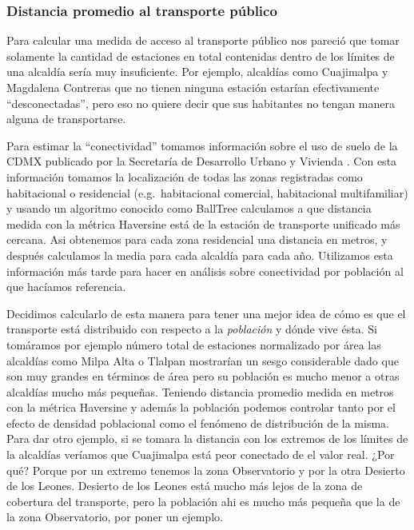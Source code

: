 \documentclass[
  spanish,
]{article}
\begin{document}
\hypertarget{distancia-promedio-al-transporte-puxfablico}{%
\subsubsection{Distancia promedio al transporte
público}\label{distancia-promedio-al-transporte-puxfablico}}

Para calcular una medida de acceso al transporte público nos pareció que
tomar solamente la cantidad de estaciones en total contenidas dentro de
los límites de una alcaldía sería muy insuficiente. Por ejemplo,
alcaldías como Cuajimalpa y Magdalena Contreras que no tienen ninguna
estación estarían efectivamente ``desconectadas'', pero eso no quiere
decir que sus habitantes no tengan manera alguna de transportarse.

Para estimar la ``conectividad'' tomamos información sobre el uso de
suelo de la CDMX publicado por la Secretaría de Desarrollo Urbano y
Vivienda \cite{usodesuelo}. Con esta información tomamos la localización
de todas las zonas registradas como habitacional o residencial
(e.g.~habitacional comercial, habitacional multifamiliar) y usando un
algoritmo conocido como BallTree calculamos a que distancia medida con
la métrica Haversine está de la estación de transporte unificado más
cercana. Asi obtenemos para cada zona residencial una distancia en
metros, y después calculamos la media para cada alcaldía para cada año.
Utilizamos esta información más tarde para hacer en análisis sobre
conectividad por población al que hacíamos referencia.

Decidimos calcularlo de esta manera para tener una mejor idea de cómo es
que el transporte está distribuido con respecto a la \emph{población} y
dónde vive ésta. Si tomáramos por ejemplo número total de estaciones
normalizado por área las alcaldías como Milpa Alta o Tlalpan mostrarían
un sesgo considerable dado que son muy grandes en términos de área pero
su población es mucho menor a otras alcaldías mucho más pequeñas.
Teniendo distancia promedio medida en metros con la métrica Haversine y
además la población podemos controlar tanto por el efecto de densidad
poblacional como el fenómeno de distribución de la misma. Para dar otro
ejemplo, si se tomara la distancia con los extremos de los límites de la
alcaldías veríamos que Cuajimalpa está peor conectado de el valor real.
¿Por qué? Porque por un extremo tenemos la zona Observatorio y por la
otra Desierto de los Leones. Desierto de los Leones está mucho más lejos
de la zona de cobertura del transporte, pero la población ahi es mucho
más pequeña que la de la zona Observatorio, por poner un ejemplo.
\end{document}

